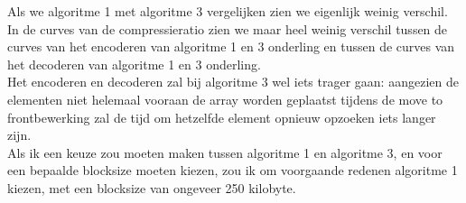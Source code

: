 \documentclass[11pt,a4paper]{article}
\begin{document}
Als we algoritme 1 met algoritme 3 vergelijken zien we eigenlijk weinig verschil. In de curves van de compressieratio zien we maar heel weinig verschil tussen de curves van het encoderen van algoritme 1 en 3 onderling en tussen de curves van het decoderen van algoritme 1 en 3 onderling.\\
Het encoderen en decoderen zal bij algoritme 3 wel iets trager gaan: aangezien de elementen niet helemaal vooraan de array worden geplaatst tijdens de move to frontbewerking zal de tijd om hetzelfde element opnieuw opzoeken iets langer zijn.\\

Als ik een keuze zou moeten maken tussen algoritme 1 en algoritme 3, en voor een bepaalde blocksize moeten kiezen, zou ik om voorgaande redenen algoritme 1 kiezen, met een blocksize van ongeveer 250 kilobyte.
\end{document}
